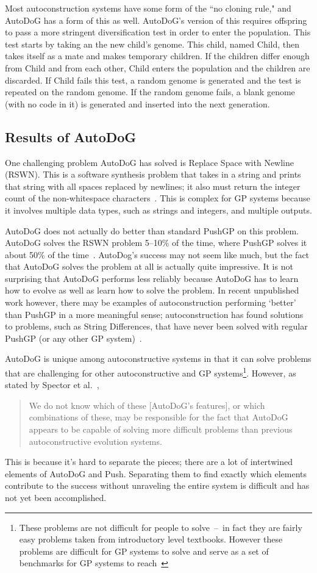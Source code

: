 \documentclass{sig-alternate}
\begin{document}
Most autoconstruction systems have some form of the ``no cloning rule," and AutoDoG has a form of this as well. AutoDoG's version of this requires offspring to pass a more stringent diversification test in order to enter the population. This test starts by taking an the new child's genome. This child, named Child, then takes itself as a mate and makes temporary children. If the children differ enough from Child and from each other, Child enters the population and the children are discarded. If Child fails this test, a random genome is generated and the test is repeated on the random genome. If the random genome fails, a blank genome (with no code in it) is generated and inserted into the next generation.
\vspace{.3cm}
\subsection{Results of AutoDoG}
\label{sec:results}
One challenging problem AutoDoG has solved is Replace Space with Newline (RSWN). This is a software synthesis problem that takes in a string and prints that string with all spaces replaced by newlines; it also must return the integer count of the non-whitespace characters~\cite{helmuth:2015}. This is complex for GP systems because it involves multiple data types, such as strings and integers, and multiple outputs.

AutoDoG does not actually do better than standard PushGP on this problem. AutoDoG solves the RSWN problem 5--10\% of the time, where PushGP solves it about 50\% of the time~\cite{helmuth:2015}. AutoDog's success may not seem like much, but the fact that AutoDoG solves the problem at all is actually quite impressive. It is not surprising that AutoDoG performs less reliably because AutoDoG has to learn how to evolve as well as learn how to solve the problem. In recent unpublished work however, there may be examples of autoconstruction performing `better' than PushGP in a more meaningful sense; autoconstruction has found solutions to problems, such as String Differences, that have never been solved with regular PushGP (or any other GP system)~\cite{eva:2017}.

AutoDoG is unique among autoconstructive systems in that it can solve problems that are challenging for other autoconstructive and GP systems\footnote{These problems are not difficult for people to solve~--~in fact they are fairly easy problems taken from introductory level textbooks. However these problems are difficult for GP systems to solve and serve as a set of benchmarks for GP systems to reach~\cite{helmuth:2015}}. However, as stated by Spector et al.~\cite{spector:2016},
\begin{quotation}
	We do not know which of these [AutoDoG's features], or which combinations of these, may be responsible for the fact that AutoDoG appears to be capable of solving more difficult problems than previous autoconstructive evolution systems.
\end{quotation}
This is because it's hard to separate the pieces; there are a lot of intertwined elements of AutoDoG and Push. Separating them to find exactly which elements contribute to the success without unraveling the entire system is difficult and has not yet been accomplished.
\end{document}
